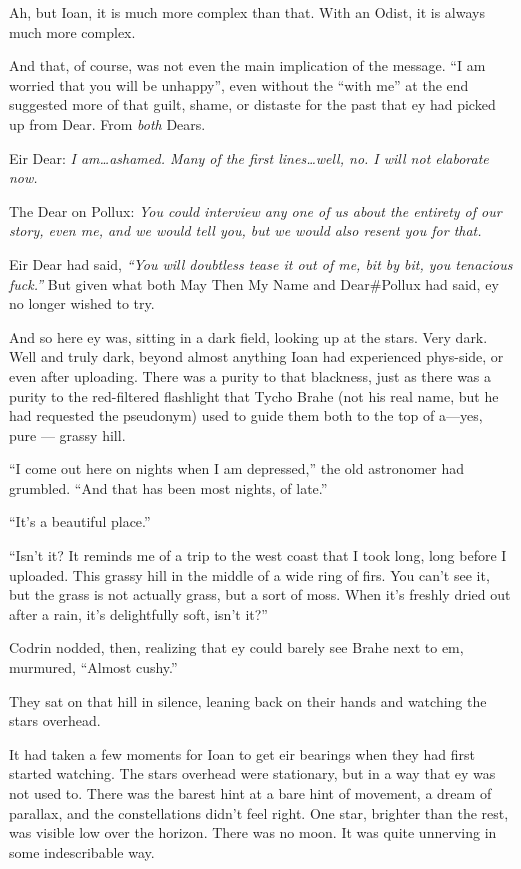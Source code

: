 Ah, but Ioan, it is much more complex than that. With an Odist, it is always much more complex.

And that, of course, was not even the main implication of the message. ``I am worried that you will be unhappy'', even without the ``with me'' at the end suggested more of that guilt, shame, or distaste for the past that ey had picked up from Dear. From \emph{both} Dears.

Eir Dear: \emph{I am\ldots ashamed. Many of the first lines\ldots well, no. I will not elaborate now.}

The Dear on Pollux: \emph{You could interview any one of us about the entirety of our story, even me, and we would tell you, but we would also resent you for that.}

Eir Dear had said, \emph{``You will doubtless tease it out of me, bit by bit, you tenacious fuck.''} But given what both May Then My Name and Dear\#Pollux had said, ey no longer wished to try.

And so here ey was, sitting in a dark field, looking up at the stars. Very dark. Well and truly dark, beyond almost anything Ioan had experienced phys-side, or even after uploading. There was a purity to that blackness, just as there was a purity to the red-filtered flashlight that Tycho Brahe (not his real name, but he had requested the pseudonym) used to guide them both to the top of a---yes, pure — grassy hill.

``I come out here on nights when I am depressed,'' the old astronomer had grumbled. ``And that has been most nights, of late.''

``It's a beautiful place.''

``Isn't it? It reminds me of a trip to the west coast that I took long, long before I uploaded. This grassy hill in the middle of a wide ring of firs. You can't see it, but the grass is not actually grass, but a sort of moss. When it's freshly dried out after a rain, it's delightfully soft, isn't it?''

Codrin nodded, then, realizing that ey could barely see Brahe next to em, murmured, ``Almost cushy.''

They sat on that hill in silence, leaning back on their hands and watching the stars overhead.

It had taken a few moments for Ioan to get eir bearings when they had first started watching. The stars overhead were stationary, but in a way that ey was not used to. There was the barest hint at a bare hint of movement, a dream of parallax, and the constellations didn't feel right. One star, brighter than the rest, was visible low over the horizon. There was no moon. It was quite unnerving in some indescribable way.

